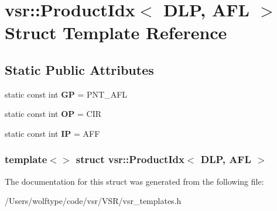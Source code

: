 \hypertarget{structvsr_1_1_product_idx_3_01_d_l_p_00_01_a_f_l_01_4}{\section{vsr\-:\-:Product\-Idx$<$ D\-L\-P, A\-F\-L $>$ Struct Template Reference}
\label{structvsr_1_1_product_idx_3_01_d_l_p_00_01_a_f_l_01_4}
}
\subsection*{Static Public Attributes}
\begin{DoxyCompactItemize}
\item 
\hypertarget{structvsr_1_1_product_idx_3_01_d_l_p_00_01_a_f_l_01_4_ad7f5c790c1e7fd20b53846df1523015a}{static const int {\bfseries G\-P} = P\-N\-T\-\_\-\-A\-F\-L}\label{structvsr_1_1_product_idx_3_01_d_l_p_00_01_a_f_l_01_4_ad7f5c790c1e7fd20b53846df1523015a}

\item 
\hypertarget{structvsr_1_1_product_idx_3_01_d_l_p_00_01_a_f_l_01_4_aaabeb7ec2bb48b8e2db9cad9cd4c54df}{static const int {\bfseries O\-P} = C\-I\-R}\label{structvsr_1_1_product_idx_3_01_d_l_p_00_01_a_f_l_01_4_aaabeb7ec2bb48b8e2db9cad9cd4c54df}

\item 
\hypertarget{structvsr_1_1_product_idx_3_01_d_l_p_00_01_a_f_l_01_4_ad2631e355eb87d3f4d21f5f45f59d30a}{static const int {\bfseries I\-P} = A\-F\-F}\label{structvsr_1_1_product_idx_3_01_d_l_p_00_01_a_f_l_01_4_ad2631e355eb87d3f4d21f5f45f59d30a}

\end{DoxyCompactItemize}
\subsubsection*{template$<$$>$ struct vsr\-::\-Product\-Idx$<$ D\-L\-P, A\-F\-L $>$}



The documentation for this struct was generated from the following file\-:\begin{DoxyCompactItemize}
\item 
/\-Users/wolftype/code/vsr/\-V\-S\-R/vsr\-\_\-templates.\-h\end{DoxyCompactItemize}
